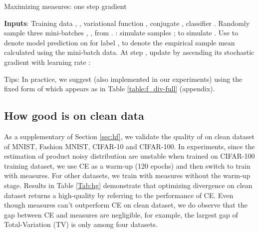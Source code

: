 \begin{algorithm}
\caption{Maximizing  measures: one step gradient}\label{alg:main1}
\begin{algorithmic}[1]
\STATE \textbf{Inputs}: Training data , , variational function , conjugate , classifier . 
\STATE Randomly sample three mini-batches , ,  from . : simulate samples ;   
 to simulate . 
\STATE Use  to denote model prediction on  for label ,   to denote the empirical sample mean calculated using the mini-batch data.
\STATE At step , update  by ascending its stochastic gradient with learning rate : 
 
Tips: In practice, we suggest (also implemented in our experiments) using the fixed form of  which appears as  in Table \ref{table:f_div-full} (appendix).
\end{algorithmic}
\end{algorithm}


\subsection{How good is  on clean data}
As a supplementary of Section \ref{sec:hf}, we validate the quality of  on clean dataset of MNIST, Fashion MNIST, CIFAR-10 and CIFAR-100. In experiments, since the estimation of product noisy distribution are unstable when trained on CIFAR-100 training dataset, we use CE as a warm-up (120 epochs) and then switch to train with  measures. For other datasets, we train with  measures without the warm-up stage. Results in Table \ref{Tab:hg} demonstrate that optimizing divergence on clean dataset returns a high-quality  by referring to the performance of CE. Even though  measures can't outperform CE on clean dataset, we do observe that the gap between CE and  measures are negligible, for example, the largest gap of Total-Variation (TV) is only  among four datasets.  


